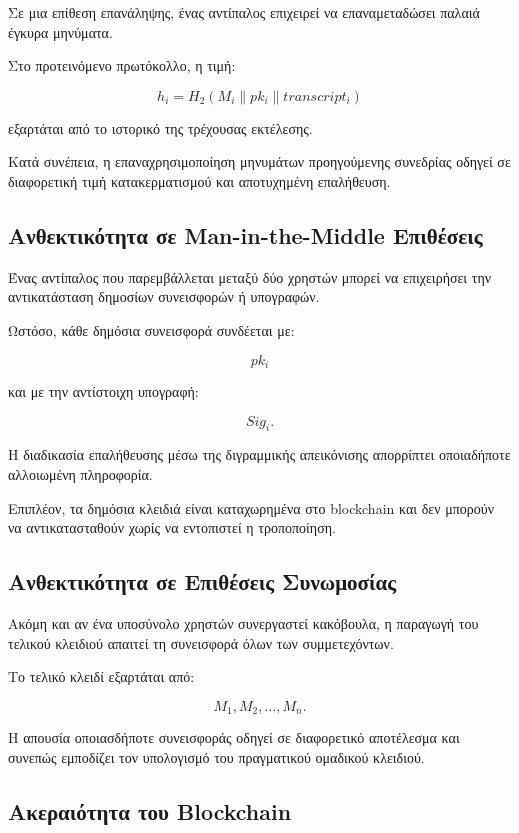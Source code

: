 \documentclass[12pt,a4paper]{report}
\begin{document}
Σε μια επίθεση επανάληψης, ένας αντίπαλος επιχειρεί να επαναμεταδώσει παλαιά έγκυρα μηνύματα.

Στο προτεινόμενο πρωτόκολλο, η τιμή:

\[
h_i =
H_2
\left(
M_i
\parallel
pk_i
\parallel
transcript_i
\right)
\]

εξαρτάται από το ιστορικό της τρέχουσας εκτέλεσης.

Κατά συνέπεια, η επαναχρησιμοποίηση μηνυμάτων προηγούμενης συνεδρίας οδηγεί σε διαφορετική τιμή κατακερματισμού και αποτυχημένη επαλήθευση.

\subsection{Ανθεκτικότητα σε Man-in-the-Middle Επιθέσεις}

Ένας αντίπαλος που παρεμβάλλεται μεταξύ δύο χρηστών μπορεί να επιχειρήσει την αντικατάσταση δημοσίων συνεισφορών ή υπογραφών.

Ωστόσο, κάθε δημόσια συνεισφορά συνδέεται με:

\[
pk_i
\]

και με την αντίστοιχη υπογραφή:

\[
Sig_i.
\]

Η διαδικασία επαλήθευσης μέσω της διγραμμικής απεικόνισης απορρίπτει οποιαδήποτε αλλοιωμένη πληροφορία.

Επιπλέον, τα δημόσια κλειδιά είναι καταχωρημένα στο blockchain και δεν μπορούν να αντικατασταθούν χωρίς να εντοπιστεί η τροποποίηση.

\subsection{Ανθεκτικότητα σε Επιθέσεις Συνωμοσίας}

Ακόμη και αν ένα υποσύνολο χρηστών συνεργαστεί κακόβουλα, η παραγωγή του τελικού κλειδιού απαιτεί τη συνεισφορά όλων των συμμετεχόντων.

Το τελικό κλειδί εξαρτάται από:

\[
M_1,M_2,\ldots,M_n.
\]

Η απουσία οποιασδήποτε συνεισφοράς οδηγεί σε διαφορετικό αποτέλεσμα και συνεπώς εμποδίζει τον υπολογισμό του πραγματικού ομαδικού κλειδιού.

\subsection{Ακεραιότητα του Blockchain}
\end{document}
